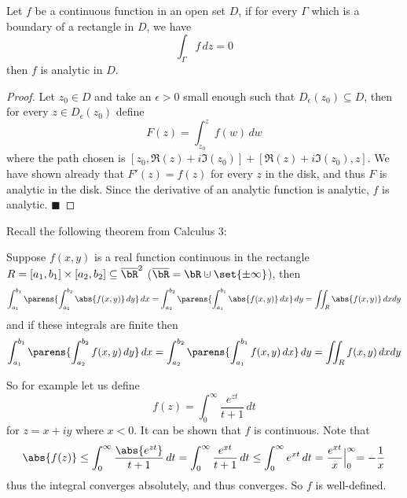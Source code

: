 \documentclass[10pt]{article}
\def\qed{\hskip1cm\hbox{}\hfill$\blacksquare$}
\begin{document}


\bigskip

\begin{thrm*}

    Let $f$ be a continuous function in an open set $D$, if for every $\Gamma$ which is a boundary of a rectangle in $D$, we have
    \[ \int_\Gamma f\,dz = 0 \]
    then $f$ is analytic in $D$.

\end{thrm*}

\begin{proof}

    Let $z_0\in D$ and take an $\epsilon>0$ small enough such that $D_\epsilon(z_0)\subseteq D$, then for every $z\in D_\epsilon(z_0)$ define
    \[ F(z) = \int_{z_0}^z f(w)\,dw \]
    where the path chosen is $[z_0,\Re(z)+i\Im(z_0)]+[\Re(z)+i\Im(z_0),z]$.
    We have shown already that $F'(z)=f(z)$ for every $z$ in the disk, and thus $F$ is analytic in the disk.
    Since the derivative of an analytic function is analytic, $f$ is analytic.
    \qed

\end{proof}

Recall the following theorem from Calculus $3$:

\begin{thrm*}

    Suppose $f(x,y)$ is a real function continuous in the rectangle $R=[a_1,b_1]\times[a_2,b_2]\subseteq\overline\bR^2$ ($\overline\bR=\bR\dcup\set{\pm\infty}$), then
    \[ \int_{a_1}^{b_1}\parens{\int_{a_2}^{b_2}\abs{f(x,y)}\,dy}\,dx = \int_{a_2}^{b_2}\parens{\int_{a_1}^{b_1}\abs{f(x,y)}\,dx}\,dy = \iint_R\abs{f(x,y)}\,dxdy \]
    and if these integrals are finite then
    \[ \int_{a_1}^{b_1}\parens{\int_{a_2}^{b_2}f(x,y)\,dy}\,dx = \int_{a_2}^{b_2}\parens{\int_{a_1}^{b_1}f(x,y)\,dx}\,dy = \iint_Rf(x,y)\,dxdy \]

\end{thrm*}

So for example let us define
\[ f(z) = \int_0^\infty \frac{e^{zt}}{t+1}\,dt \]
for $z=x+iy$ where $x<0$.
It can be shown that $f$ is continuous.
Note that
\[ \abs{f(z)} \leq \int_0^\infty \frac{\abs{e^{zt}}}{t+1}\,dt = \int_0^\infty\frac{e^{xt}}{t+1}\,dt \leq \int_0^\infty e^{xt}\,dt = \frac{e^{xt}}x\Bigl|_0^\infty = -\frac1x \]
thus the integral converges absolutely, and thus converges.
So $f$ is well-defined.
\end{document}
